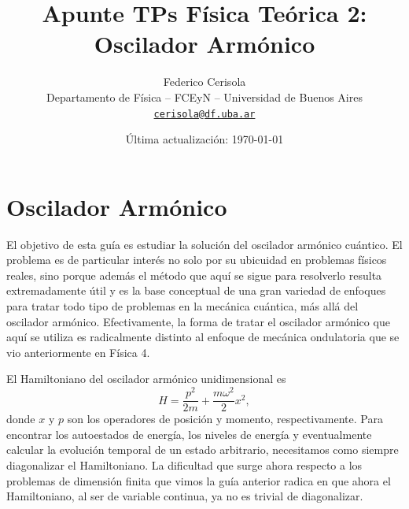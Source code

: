 \documentclass[10pt, a4paper]{article}
\numberwithin{equation}{subsection}
\begin{document}
\title{Apunte TPs Física Teórica 2: Oscilador Armónico}
\author{Federico Cerisola
  \\ \small{Departamento de Física -- FCEyN -- Universidad de Buenos Aires}
  \\ \small{\href{mailto:cerisola@df.uba.ar}{\nolinkurl{cerisola@df.uba.ar}}}
}
\date{\small Última actualización: \today}
\maketitle
\thispagestyle{empty}

\vfill
\doclicenseThis

\pagebreak

\newpage
  \tableofcontents
\newpage

\section{Oscilador Armónico}

El objetivo de esta guía es estudiar la solución del oscilador armónico
cuántico. El problema es de particular interés no solo por su ubicuidad en
problemas físicos reales, sino porque además el método que aquí se sigue para
resolverlo resulta extremadamente útil y es la base conceptual de una gran
variedad de enfoques para tratar todo tipo de problemas en la mecánica
cuántica, más allá del oscilador armónico. Efectivamente, la forma de tratar el
oscilador armónico que aquí se utiliza es radicalmente distinto al enfoque de
mecánica ondulatoria que se vio anteriormente en Física 4.

El Hamiltoniano del oscilador armónico unidimensional es
\begin{equation}
  H = \frac{p^2}{2m} + \frac{m\omega^2}{2}x^2,
\end{equation}
donde $x$ y $p$ son los operadores de posición y momento, respectivamente.
Para encontrar los autoestados de energía, los niveles de energía y
eventualmente calcular la evolución temporal de un estado arbitrario,
necesitamos como siempre diagonalizar el Hamiltoniano. La dificultad que surge
ahora respecto a los problemas de dimensión finita que vimos la guía anterior
radica en que ahora el Hamiltoniano, al ser de variable continua, ya no es
trivial de diagonalizar.
\end{document}
